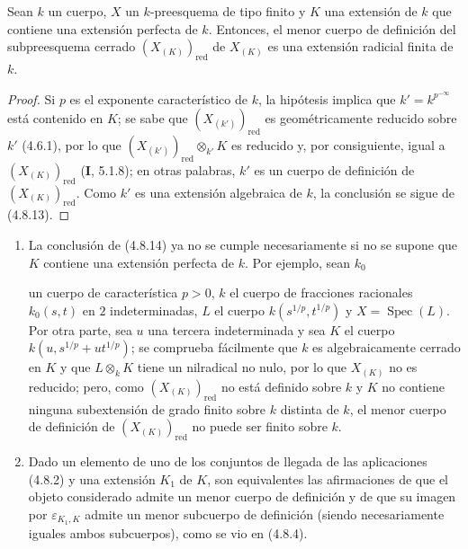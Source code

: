 \begin{proposition}[4.8.14]
\label{IV.2.4.8.14-fr}
Sean $k$ un cuerpo, $X$ un $k$-preesquema de tipo finito y $K$ una extensión de
$k$ que contiene una extensión perfecta de $k$. Entonces, el menor cuerpo de
definición del subpreesquema cerrado $(X_{(K)})_{\mathrm{red}}$ de $X_{(K)}$
es una extensión radicial finita de $k$.
\end{proposition}

\begin{proof}
Si $p$ es el exponente característico de $k$, la hipótesis implica que
$k'=k^{p^{-\infty}}$ está contenido en $K$; se sabe que
$(X_{(k')})_{\mathrm{red}}$ es geométricamente reducido sobre $k'$ (4.6.1), por
lo que $(X_{(k')})_{\mathrm{red}}\otimes_{k'}K$ es reducido y, por consiguiente,
igual a $(X_{(K)})_{\mathrm{red}}$ (\textbf I, 5.1.8); en otras palabras, $k'$ es un
cuerpo de definición de $(X_{(K)})_{\mathrm{red}}$. Como $k'$ es una extensión
algebraica de $k$, la conclusión se sigue de (4.8.13).
\end{proof}

\begin{remarks}[4.8.15]
\label{IV.2.4.8.15-fr}
\begin{enumerate}
\item[(i)] La conclusión de (4.8.14) ya no se cumple necesariamente si no se
supone que $K$ contiene una extensión perfecta de $k$. Por ejemplo, sean $k_0$


un cuerpo de característica $p>0$, $k$ el cuerpo de fracciones racionales
$k_0(s,t)$ en $2$ indeterminadas, $L$ el cuerpo
$k(s^{1/p},t^{1/p})$ y $X=\operatorname{Spec}(L)$. Por otra parte, sea $u$
una tercera indeterminada y sea $K$ el cuerpo
$k(u,s^{1/p}+ut^{1/p})$; se comprueba fácilmente que $k$ es algebraicamente
cerrado en $K$ y que $L\otimes_kK$ tiene un nilradical no nulo, por lo que
$X_{(K)}$ no es reducido; pero, como $(X_{(K)})_{\mathrm{red}}$ no está definido
sobre $k$ y $K$ no contiene ninguna subextensión de grado finito sobre $k$
distinta de $k$, el menor cuerpo de definición de $(X_{(K)})_{\mathrm{red}}$ no
puede ser finito sobre $k$.

\item[(ii)] Dado un elemento de uno de los conjuntos de llegada de las
aplicaciones (4.8.2) y una extensión $K_1$ de $K$, son equivalentes las
afirmaciones de que el objeto considerado admite un menor cuerpo de definición
y de que su imagen por $\varepsilon_{K_1,K}$ admite un menor subcuerpo de
definición (siendo necesariamente iguales ambos subcuerpos), como se vio en
(4.8.4).
\end{enumerate}
\end{remarks}
